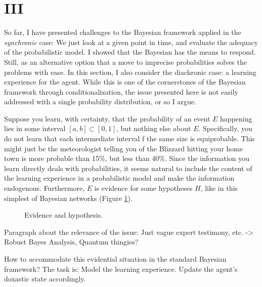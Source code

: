 \documentclass[11pt, a4paper]{scrartcl}
\begin{document}
\section{III}

So far, I have presented challenges to the Bayesian framework applied in the \emph{synchronic} case: We just look at a given point in time, and evaluate the adequacy of the probabilistic model. I showed that the Bayesian has the means to respond. Still, as an alternative option that a move to imprecise probabilities solves the problems with ease. In this section, I also consider the diachronic case: a learning experience for the agent. While this is one of the cornerstones of the Bayesian framework through conditionalization, the issue presented here is not easily addressed with a single probability distribution, or so I argue. 

Suppose you learn, with certainty, that the probability of an event $E$ happening lies in some interval $[a,b] \subset [0,1]$, but nothing else about $E$. Specifically, you do not learn that each intermediate interval f the same size is equiprobable. This might just be the meteorologist telling you of the Blizzard hitting your home town is more probable than 15\%, but less than 40\%. Since the information you learn directly deals with probabilities, it seems natural to include the content of the learning experience in a probabilistic model and make the information endogenous. Furthermore, $E$ is evidence for some hypotheses $H$, like in this simplest of Bayesian networks (Figure \ref{fig:net}). 

\begin{figure}[h]
\centering
{}
\caption{Evidence and hypothesis.}
\label{fig:net}
\end{figure}

Paragraph about the relevance of the issue: Just vague expert testimony, etc. -> Robust Bayes Analysis, Quantum thingies? 

How to accommodate this evidential situation in the standard Bayesian framework? The task is: Model the learning experience. Update the agent's doxastic state accordingly. 
\end{document}
